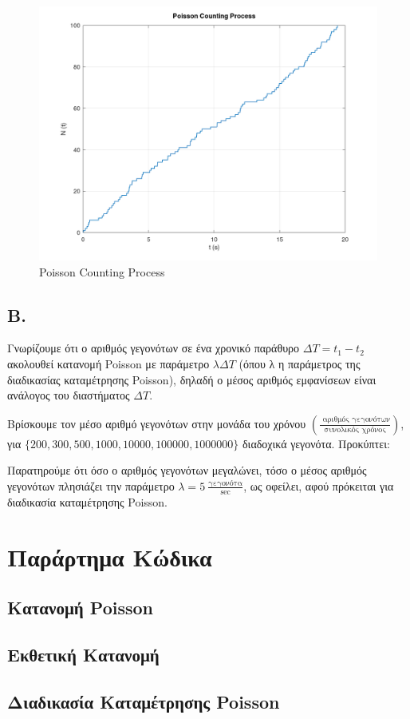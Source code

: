\documentclass[a4paper]{article}
\begin{document}
\begin{figure}[H]
	\includegraphics[width=\textwidth]{../images/Poisson_Counting_A.png}
	\caption{Poisson Counting Process}
	\label{fig:Poisson Counting A}
\end{figure}

\subsection*{Β.}

Γνωρίζουμε ότι ο αριθμός γεγονότων σε ένα χρονικό παράθυρο ${ΔΤ = t_1 - t_2 }$ ακολουθεί κατανομή Poisson με παράμετρο $ λΔΤ $  (όπου λ η παράμετρος της διαδικασίας καταμέτρησης Poisson), δηλαδή ο μέσος αριθμός εμφανίσεων είναι ανάλογος του διαστήματος $ΔΤ$.

Βρίσκουμε τον μέσο αριθμό γεγονότων στην μονάδα του χρόνου $\left(\frac{\text{ αριθμός γεγονότων}}{\text{συνολικός χρόνος}}\right)$, για $ \{200,300,500,1000,10000,100000,1000000\}$ διαδοχικά γεγονότα. Προκύπτει:



Παρατηρούμε ότι όσο ο αριθμός γεγονότων μεγαλώνει, τόσο ο μέσος αριθμός γεγονότων πλησιάζει την παράμετρο $ λ = 5 \ \frac{\text{γεγονότα}}{\text{sec}} $, ως οφείλει, αφού πρόκειται για διαδικασία καταμέτρησης Poisson.

\section*{Παράρτημα Κώδικα}

\subsection*{Κατανομή Poisson}



\subsection*{Εκθετική Κατανομή}



\subsection*{Διαδικασία Καταμέτρησης Poisson}

\end{document}
